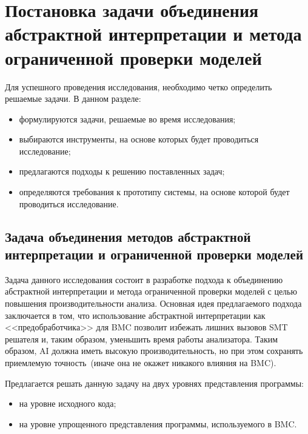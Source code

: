 \chapter{Постановка задачи объединения абстрактной интерпретации и метода 
ограниченной проверки моделей}
Для успешного проведения исследования, необходимо четко определить решаемые 
задачи. В данном разделе:
\begin{itemize}
\item формулируются задачи, решаемые во время исследования;
\item выбираются инструменты, на основе которых будет проводиться исследование;
\item предлагаются подходы к решению поставленных задач;
\item определяются требования к прототипу системы, на основе которой будет 
проводиться исследование.
\end{itemize}

\section{Задача объединения методов абстрактной интерпретации и ограниченной 
проверки моделей}
Задача данного исследования состоит в разработке подхода к объединению 
абстрактной интерпретации и метода ограниченной проверки моделей с целью 
повышения производительности анализа. Основная идея предлагаемого подхода 
заключается в том, что использование абстрактной интерпретации как 
<<предобработчика>> для BMC позволит избежать лишних вызовов SMT решателя и,
таким образом, уменьшить время работы анализатора. Таким образом, AI должна
иметь высокую производительность, но при этом сохранять приемлемую 
точность~(иначе она не окажет никакого влияния на BMC).

Предлагается решать данную задачу на двух уровнях представления программы:
\begin{itemize}
\item на уровне исходного кода;
\item на уровне упрощенного представления программы, используемого в BMC.
\end{itemize}

